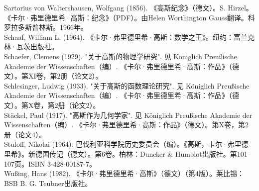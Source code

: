 Sartorius von Waltershausen, Wolfgang (1856). 《高斯纪念》（德文）。S. Hirzel。\\  
《卡尔·弗里德里希·高斯：纪念》（PDF）。由Helen Worthington Gauss翻译。科罗拉多斯普林斯。1966年。\\
Schaaf, William L. (1964). 《卡尔·弗里德里希·高斯：数学之王》。纽约：富兰克林·瓦茨出版社。\\  
Schaefer, Clemens (1929). "关于高斯的物理学研究". 见 Königlich Preußische Akademie der Wissenschaften（编）. 《卡尔·弗里德里希·高斯：作品》（德文）。第XI卷，第2册（论文2）。\\  
Schlesinger, Ludwig (1933). "关于高斯的函数理论研究". 见 Königlich Preußische Akademie der Wissenschaften（编）. 《卡尔·弗里德里希·高斯：作品》（德文）。第X卷，第2册（论文2）。\\  
Stäckel, Paul (1917). "高斯作为几何学家". 见 Königlich Preußische Akademie der Wissenschaften（编）. 《卡尔·弗里德里希·高斯：作品》（德文）。第X卷，第2册（论文4）。\\  
Stuloff, Nikolai (1964). 巴伐利亚科学院历史委员会（编）。《高斯，卡尔·弗里德里希》。新德国传记（德文）。第6卷。柏林：Duncker & Humblot出版社。第101–107页。ISBN 3-428-00187-7。\\  
Wußing, Hans (1982). 《卡尔·弗里德里希·高斯》（德文）（第4版）。莱比锡：BSB B. G. Teubner出版社。
